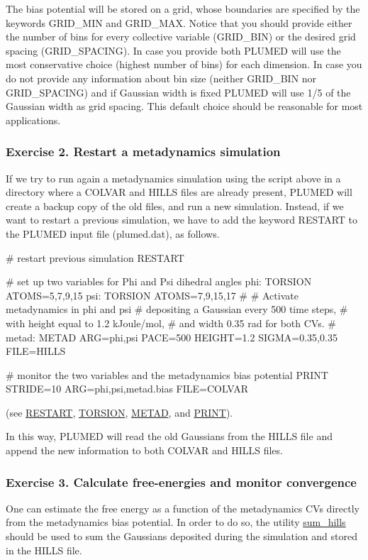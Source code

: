 The bias potential will be stored on a grid, whose boundaries are specified by the keywords G\+R\+I\+D\+\_\+\+M\+I\+N and G\+R\+I\+D\+\_\+\+M\+A\+X. Notice that you should provide either the number of bins for every collective variable (G\+R\+I\+D\+\_\+\+B\+I\+N) or the desired grid spacing (G\+R\+I\+D\+\_\+\+S\+P\+A\+C\+I\+N\+G). In case you provide both P\+L\+U\+M\+E\+D will use the most conservative choice (highest number of bins) for each dimension. In case you do not provide any information about bin size (neither G\+R\+I\+D\+\_\+\+B\+I\+N nor G\+R\+I\+D\+\_\+\+S\+P\+A\+C\+I\+N\+G) and if Gaussian width is fixed P\+L\+U\+M\+E\+D will use 1/5 of the Gaussian width as grid spacing. This default choice should be reasonable for most applications.\hypertarget{belfast-6_belfast-6-exercise-2}{}\subsubsection{Exercise 2. Restart a metadynamics simulation}\label{belfast-6_belfast-6-exercise-2}
If we try to run again a metadynamics simulation using the script above in a directory where a C\+O\+L\+V\+A\+R and H\+I\+L\+L\+S files are already present, P\+L\+U\+M\+E\+D will create a backup copy of the old files, and run a new simulation. Instead, if we want to restart a previous simulation, we have to add the keyword R\+E\+S\+T\+A\+R\+T to the P\+L\+U\+M\+E\+D input file (plumed.\+dat), as follows.

\begin{DoxyVerb}# restart previous simulation
RESTART

# set up two variables for Phi and Psi dihedral angles 
phi: TORSION ATOMS=5,7,9,15
psi: TORSION ATOMS=7,9,15,17
#
# Activate metadynamics in phi and psi
# depositing a Gaussian every 500 time steps,
# with height equal to 1.2 kJoule/mol,
# and width 0.35 rad for both CVs. 
#
metad: METAD ARG=phi,psi PACE=500 HEIGHT=1.2 SIGMA=0.35,0.35 FILE=HILLS 

# monitor the two variables and the metadynamics bias potential
PRINT STRIDE=10 ARG=phi,psi,metad.bias FILE=COLVAR\end{DoxyVerb}
 (see \hyperlink{RESTART}{R\+E\+S\+T\+A\+R\+T}, \hyperlink{TORSION}{T\+O\+R\+S\+I\+O\+N}, \hyperlink{METAD}{M\+E\+T\+A\+D}, and \hyperlink{PRINT}{P\+R\+I\+N\+T}).

In this way, P\+L\+U\+M\+E\+D will read the old Gaussians from the H\+I\+L\+L\+S file and append the new information to both C\+O\+L\+V\+A\+R and H\+I\+L\+L\+S files.\hypertarget{belfast-6_belfast-6-exercise-3}{}\subsubsection{Exercise 3. Calculate free-\/energies and monitor convergence}\label{belfast-6_belfast-6-exercise-3}
One can estimate the free energy as a function of the metadynamics C\+Vs directly from the metadynamics bias potential. In order to do so, the utility \hyperlink{sum_hills}{sum\+\_\+hills} should be used to sum the Gaussians deposited during the simulation and stored in the H\+I\+L\+L\+S file.

